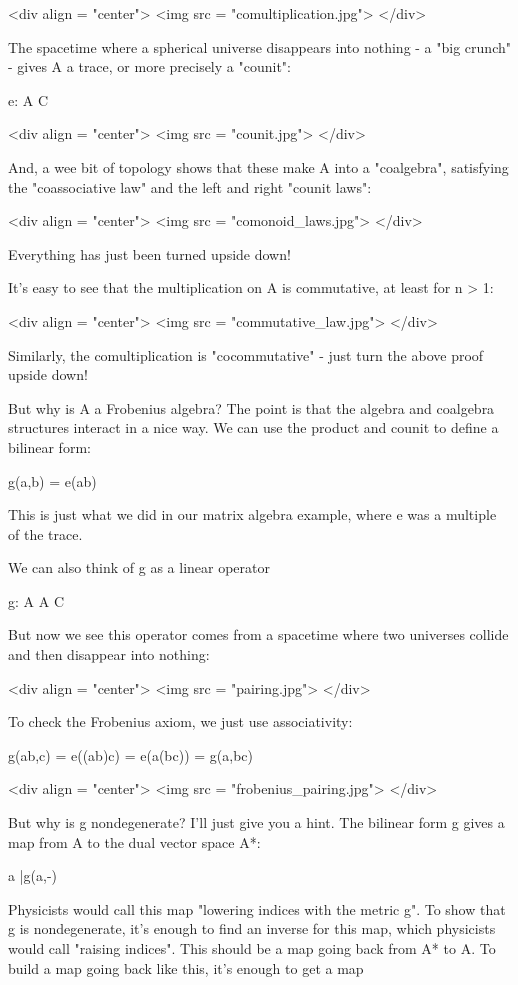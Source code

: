 <div align = "center">
<img src = "comultiplication.jpg">
</div>

The spacetime where a spherical universe disappears into nothing -
a "big crunch" - gives A a trace, or more precisely a "counit":

e: A \to  C

<div align = "center">
<img src = "counit.jpg">
</div>

And, a wee bit of topology shows that these make A into a
"coalgebra", satisfying the "coassociative law"
and the left and right "counit laws":

<div align = "center">
<img src = "comonoid_laws.jpg">
</div>

Everything has just been turned upside down!

It's easy to see that the multiplication on A is commutative, 
at least for n > 1:

<div align = "center">
<img src = "commutative_law.jpg">
</div>

Similarly, the comultiplication is "cocommutative" - just
turn the above proof upside down!

But why is A a Frobenius algebra?  The point is that the algebra
and coalgebra structures interact in a nice way.  We can use the 
product and counit to define a bilinear form:

g(a,b) = e(ab)

This is just what we did in our matrix algebra example, where e
was a multiple of the trace.                  

We can also think of g as a linear operator 

g: A \otimes  A \to  C

But now we see this operator comes from a spacetime where two 
universes collide and then disappear into nothing:

<div align = "center">
<img src = "pairing.jpg">
</div>
               
           
To check the Frobenius axiom, we just use associativity:

g(ab,c) = e((ab)c) = e(a(bc)) = g(a,bc)

<div align = "center">
<img src = "frobenius_pairing.jpg">
</div>

But why is g nondegenerate?  I'll just give you a hint.  
The bilinear form g gives a map from A to the dual vector space A*:

a |\to  g(a,-)

Physicists would call this map "lowering indices with the metric
g".  To show that g is nondegenerate, it's enough to find an
inverse for this map, which physicists would call "raising
indices".  This should be a map going back from A* to A.  To
build a map going back like this, it's enough to get a map

